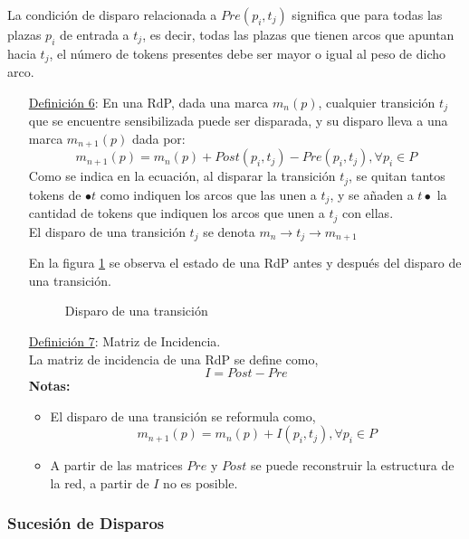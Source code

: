 La condición de disparo relacionada a $Pre(p_{i}, t_{j})$ significa que para
todas las plazas $p_{i}$ de entrada a $t_{j}$, es decir, todas las plazas que
tienen arcos que apuntan hacia $t_{j}$, el número de tokens presentes debe ser
mayor o igual al peso de dicho arco.

\begin{itemize}
  \item [\underline{Definición 6}:] En una RdP, dada una marca $ m_{n}(p) $,
  cualquier transición $ t_{j} $ que se encuentre sensibilizada puede ser
  disparada, y su disparo lleva a una marca $ m_{n+1}(p)$ dada por:
  $$ m_{n+1}(p) = m_{n}(p) + Post(p_{i}, t_{j}) - Pre(p_{i}, t_{j}), \forall
  p_{i} \in P $$
  Como se indica en la ecuación, al disparar la transición $ t_{j} $, se quitan
  tantos tokens de $ \bullet t $ como indiquen los arcos que las unen a $ t_{j}
  $, y se añaden a $ t \bullet $ la cantidad de tokens que indiquen los arcos
  que unen a $ t_{j} $ con ellas.\\
  El disparo de una transición $ t_{j} $ se denota $ m_{n}\rightarrow t_{j}
  \rightarrow m_{n+1} $

  En la figura {\ref{fig:disparo_transicion}} se observa el estado de una RdP
  antes y después del disparo de una transición.
  \begin{figure}[h]
    \centering
    \caption{Disparo de una transición}
    \label{fig:disparo_transicion}
  \end{figure}
  
  \item  [\underline{Definición 7}:] Matriz de Incidencia.\\
  La matriz de incidencia de una RdP se define como,
  $$ I = Post - Pre $$
  \textbf{Notas:}
  \begin{itemize}
    \item El disparo de una transición se reformula como, $$ m_{n+1}(p) =
    m_{n}(p) + I(p_{i}, t_{j}), \forall p_{i} \in P $$
    \item A partir de las matrices $Pre$ y $Post$ se puede reconstruir la
    estructura de la red, a partir de $I$ no es posible.
  \end{itemize}
\end{itemize}

\subsubsection{Sucesión de Disparos}

